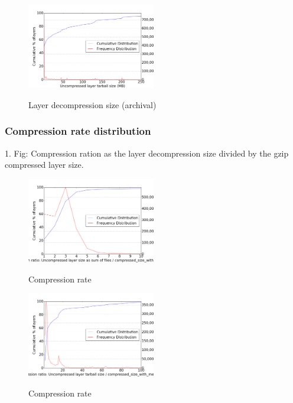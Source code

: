 \begin{figure}
	\centering
	\includegraphics[width=0.5\textwidth]{graphs/Uncompressed_layer_tarball_size_(MB).png}\\
	\caption{Layer decompression size (archival)}\label{fig_image_size_compression}
\end{figure}

\subsubsection{Compression rate distribution}

1. Fig: Compression ration as the layer decompression size divided by the gzip compressed layer size.

\begin{figure}
	\centering
	\includegraphics[width=0.5\textwidth]{graphs/Compression_ratio_Uncompressed_layer_size_as_sum_of_files_divided_by_compressed_size_with_method_gzip.png}\\
	\caption{Compression rate}\label{fig_image_size_compression}
\end{figure}

\begin{figure}
	\centering
	\includegraphics[width=0.5\textwidth]{graphs/Compression_ratio_Uncompressed_layer_tarball_size_divided_by_compressed_size_with_method_gzip.png}\\
	\caption{Compression rate}\label{fig_image_size_compression}
\end{figure}

